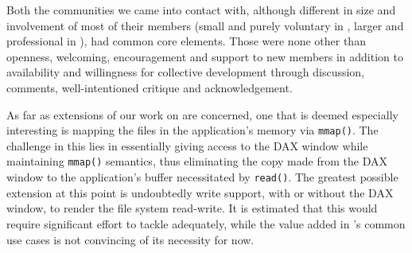 Both the communities we came into contact with, although different in size
and involvement of most of their members (small and purely voluntary in \osv{},
larger and professional in \viofs{}), had common core elements. Those were none
other than openness, welcoming, encouragement and support to new members in
addition to availability and willingness for collective development through
discussion, comments, well-intentioned critique and acknowledgement.

As far as extensions of our work on \osv{} are concerned, one that is deemed
especially interesting is mapping the files in the application's memory via
\texttt{mmap()}. The challenge in this lies in essentially giving access to the
DAX window while maintaining \texttt{mmap()} semantics, thus eliminating the
copy made from the DAX window to the application's buffer necessitated by
\texttt{read()}. The greatest possible extension at this point is undoubtedly
write support, with or without the DAX window, to render the file system
read-write. It is estimated that this would require significant effort to
tackle adequately, while the value added in \osv{}'s common use cases is not
convincing of its necessity for now.
